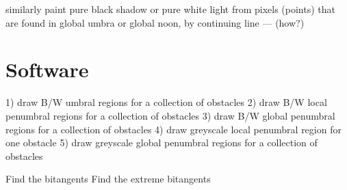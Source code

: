similarly paint pure black shadow or pure white light
     from pixels (points) that are found in global umbra
     or global noon, by continuing line --- (how?)

			
\section{Software}

	1) draw B/W umbral regions for a collection of obstacles
	2) draw B/W local penumbral regions for a collection of obstacles
	3) draw B/W global penumbral regions for a collection of obstacles 
	4) draw greyscale local penumbral region for one obstacle
	5) draw greyscale global penumbral regions for a collection of obstacles


	Find the bitangents
	Find the extreme bitangents		
